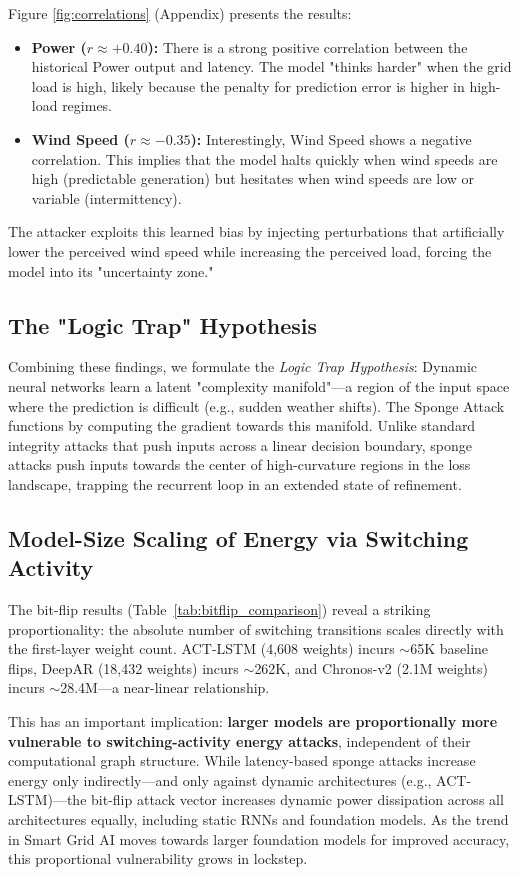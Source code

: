 Figure \ref{fig:correlations} (Appendix) presents the results:
\begin{itemize}
    \item \textbf{Power ($r \approx +0.40$):} There is a strong positive correlation between the historical Power output and latency. The model "thinks harder" when the grid load is high, likely because the penalty for prediction error is higher in high-load regimes.
    \item \textbf{Wind Speed ($r \approx -0.35$):} Interestingly, Wind Speed shows a negative correlation. This implies that the model halts quickly when wind speeds are high (predictable generation) but hesitates when wind speeds are low or variable (intermittency).
\end{itemize}
The attacker exploits this learned bias by injecting perturbations that artificially lower the perceived wind speed while increasing the perceived load, forcing the model into its "uncertainty zone."

\subsection{The "Logic Trap" Hypothesis}
Combining these findings, we formulate the \textit{Logic Trap Hypothesis}: Dynamic neural networks learn a latent "complexity manifold"—a region of the input space where the prediction is difficult (e.g., sudden weather shifts). The Sponge Attack functions by computing the gradient towards this manifold. Unlike standard integrity attacks that push inputs across a linear decision boundary, sponge attacks push inputs towards the center of high-curvature regions in the loss landscape, trapping the recurrent loop in an extended state of refinement.

\subsection{Model-Size Scaling of Energy via Switching Activity}
The bit-flip results (Table~\ref{tab:bitflip_comparison}) reveal a striking proportionality: the absolute number of switching transitions scales directly with the first-layer weight count. ACT-LSTM (4,608 weights) incurs $\sim$65K baseline flips, DeepAR (18,432 weights) incurs $\sim$262K, and Chronos-v2 (2.1M weights) incurs $\sim$28.4M—a near-linear relationship.

This has an important implication: \textbf{larger models are proportionally more vulnerable to switching-activity energy attacks}, independent of their computational graph structure. While latency-based sponge attacks increase energy only indirectly—and only against dynamic architectures (e.g., ACT-LSTM)—the bit-flip attack vector increases dynamic power dissipation across all architectures equally, including static RNNs and foundation models. As the trend in Smart Grid AI moves towards larger foundation models for improved accuracy, this proportional vulnerability grows in lockstep.

